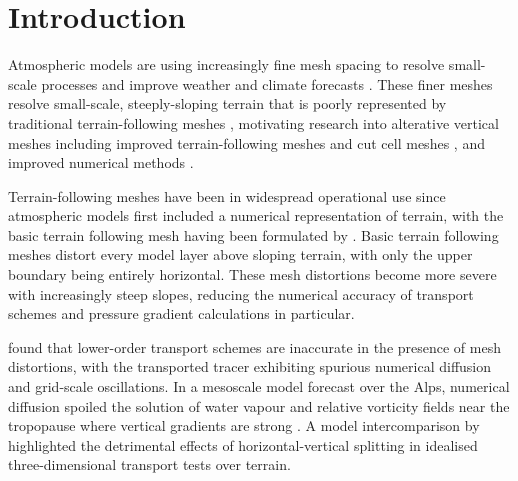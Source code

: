 \chapter{Introduction}

Atmospheric models are using increasingly fine mesh spacing to resolve small-scale processes and improve weather and climate forecasts \citep{wedi2014}.
These finer meshes resolve small-scale, steeply-sloping terrain that is poorly represented by traditional terrain-following meshes \citep{schaer2002}, motivating research into alterative vertical meshes including improved terrain-following meshes \citep{schaer2002,klemp2011} and cut cell meshes \citep{jaehn2015,yamazaki2016}, and improved numerical methods \citep{zaengl2012,steppeler-klemp2017}.

Terrain-following meshes have been in widespread operational use since atmospheric models first included a numerical representation of terrain, with the basic terrain following mesh having been formulated by \citet{galchen-somerville1975a}.
Basic terrain following meshes distort every model layer above sloping terrain, with only the upper boundary being entirely horizontal.
These mesh distortions become more severe with increasingly steep slopes, reducing the numerical accuracy of transport schemes and pressure gradient calculations in particular.

\citet{schaer2002} found that lower-order transport schemes are inaccurate in the presence of mesh distortions, with the transported tracer exhibiting spurious numerical diffusion and grid-scale oscillations.
In a mesoscale model forecast over the Alps, numerical diffusion spoiled the solution of water vapour and relative vorticity fields near the tropopause where vertical gradients are strong \citep{hoinka-zaengl2004}.
A model intercomparison by \citet{kent2014} highlighted the detrimental effects of horizontal-vertical splitting in idealised three-dimensional transport tests over terrain.







